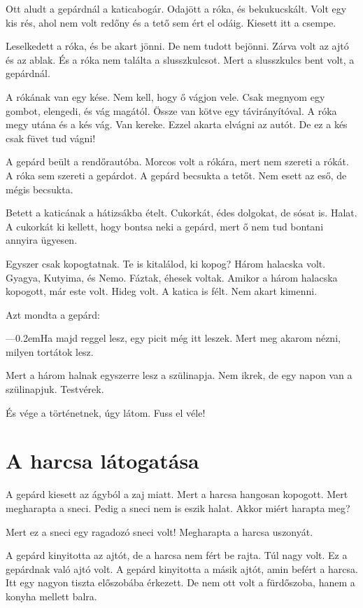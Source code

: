 \documentclass[12pt]{memoir}
\def\dash{---\kern 0.2em}
\begin{document}
Ott aludt a gepárdnál a katicabogár. Odajött a róka, és bekukucskált. Volt egy
kis rés, ahol nem volt redőny és a tető sem ért el odáig. Kiesett itt a csempe.

Leselkedett a róka, és be akart jönni. De nem tudott bejönni. Zárva volt az
ajtó és az ablak. És a róka nem találta a slusszkulcsot. Mert a slusszkulcs
bent volt, a gepárdnál.

A rókának van egy kése. Nem kell, hogy ő vágjon vele. Csak megnyom egy gombot,
elengedi, és vág magától. Össze van kötve egy távirányítóval. A róka megy utána
és a kés vág. Van kereke. Ezzel akarta elvágni az autót. De ez a kés csak füvet
tud vágni!

\bigskip

A gepárd beült a rendőrautóba. Morcos volt a rókára, mert nem szereti a rókát.
A róka sem szereti a gepárdot. A gepárd becsukta a tetőt. Nem esett az eső, de
mégis becsukta.

Betett a katicának a hátizsákba ételt. Cukorkát, édes dolgokat, de sósat is.
Halat. A cukorkát ki kellett, hogy bontsa neki a gepárd, mert ő nem tud bontani
annyira ügyesen.

Egyszer csak kopogtatnak. Te is kitalálod, ki kopog? Három halacska volt.
Gyagya, Kutyima, és Nemo. Fáztak, éhesek voltak. Amikor a három halacska
kopogott, már este volt. Hideg volt. A katica is félt. Nem akart kimenni.

Azt mondta a gepárd:

\dash Ha majd reggel lesz, egy picit még itt leszek. Mert meg akarom nézni,
milyen tortátok lesz.

Mert a három halnak egyszerre lesz a szülinapja. Nem ikrek, de egy napon van a
szülinapjuk.  Testvérek.

És vége a történetnek, úgy látom. Fuss el véle!


\section{A harcsa látogatása}
A gepárd kiesett az ágyból a zaj miatt. Mert a harcsa hangosan kopogott. Mert
megharapta a sneci. Pedig a sneci nem is eszik halat. Akkor miért harapta meg?

Mert ez a sneci egy ragadozó sneci volt! Megharapta a harcsa uszonyát.

A gepárd kinyitotta az ajtót, de a harcsa nem fért be rajta. Túl nagy volt. Ez
a gepárdnak való ajtó volt. A gepárd kinyitotta a másik ajtót, amin befért a
harcsa. Itt egy nagyon tiszta előszobába érkezett. De nem ott volt a
fürdőszoba, hanem a konyha mellett balra.
\end{document}
